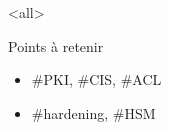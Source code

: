 \mode<all>{\texframe
{Points à retenir} %
{} %
{
\begin{itemize}
    \item \#PKI, \#CIS, \#ACL
    \item \#hardening, \#HSM
\end{itemize}
}}
